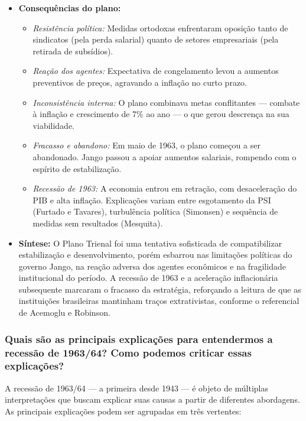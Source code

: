 \documentclass[a4paper,12pt]{article}[abntex2]
\begin{document}
\begin{itemize}
    \item \textbf{Consequências do plano:}
    \begin{itemize}
        \item \textit{Resistência política:} Medidas ortodoxas enfrentaram oposição tanto de sindicatos (pela perda salarial) quanto de setores empresariais (pela retirada de subsídios).
        \item \textit{Reação dos agentes:} Expectativa de congelamento levou a aumentos preventivos de preços, agravando a inflação no curto prazo.
        \item \textit{Inconsistência interna:} O plano combinava metas conflitantes — combate à inflação e crescimento de 7\% ao ano — o que gerou descrença na sua viabilidade.
        \item \textit{Fracasso e abandono:} Em maio de 1963, o plano começou a ser abandonado. Jango passou a apoiar aumentos salariais, rompendo com o espírito de estabilização.
        \item \textit{Recessão de 1963:} A economia entrou em retração, com desaceleração do PIB e alta inflação. Explicações variam entre esgotamento da PSI (Furtado e Tavares), turbulência política (Simonsen) e sequência de medidas sem resultados (Mesquita).
    \end{itemize}

    \item \textbf{Síntese:}
    O Plano Trienal foi uma tentativa sofisticada de compatibilizar estabilização e desenvolvimento, porém esbarrou nas limitações políticas do governo Jango, na reação adversa dos agentes econômicos e na fragilidade institucional do período. A recessão de 1963 e a aceleração inflacionária subsequente marcaram o fracasso da estratégia, reforçando a leitura de que as instituições brasileiras mantinham traços extrativistas, conforme o referencial de Acemoglu e Robinson.
\end{itemize}

\subsubsection{\textbf{Quais são as principais explicações para entendermos a recessão de 1963/64? Como podemos criticar essas explicações?}}

A recessão de 1963/64 — a primeira desde 1943 — é objeto de múltiplas interpretações que buscam explicar suas causas a partir de diferentes abordagens. As principais explicações podem ser agrupadas em três vertentes:
\end{document}
